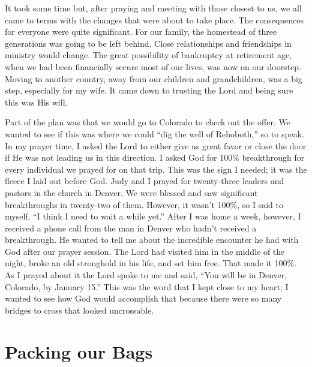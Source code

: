 \documentclass[twoside, 12pt]{book}
\begin{document}
It took some time but, after praying and meeting with those closest to us, we all came to terms with the changes that were about to take place. The consequences for everyone were quite significant. For our family, the homestead of three generations was going to be left behind. Close relationships and friendships in ministry would change. The great possibility of bankruptcy at retirement age, when we had been financially secure most of our lives, was now on our doorstep. Moving to another country, away from our children and grandchildren, was a big step, especially for my wife. It came down to trusting the Lord and being sure this was His will.

Part of the plan was that we would go to Colorado to check out the offer. We wanted to see if this was where we could “dig the well of Rehoboth,” so to speak. In my prayer time, I asked the Lord to either give us great favor or close the door if He was not leading us in this direction. I asked God for 100\% breakthrough for every individual we prayed for on that trip. This was the sign I needed; it was the fleece I laid out before God. Judy and I prayed for twenty-three leaders and pastors in the church in Denver. We were blessed and saw significant breakthroughs in twenty-two of them. However, it wasn’t 100\%, so I said to myself, “I think I need to wait a while yet.” After I was home a week, however, I received a phone call from the man in Denver who hadn’t received a breakthrough. He wanted to tell me about the incredible encounter he had with God after our prayer session. The Lord had visited him in the middle of the night, broke an old stronghold in his life, and set him free. That made it 100\%. As I prayed about it the Lord spoke to me and said, “You will be in Denver, Colorado, by January 15.” This was the word that I kept close to my heart; I wanted to see how God would accomplish that because there were so many bridges to cross that looked uncrossable.



\chapter{Packing our Bags}
\
\end{document}

